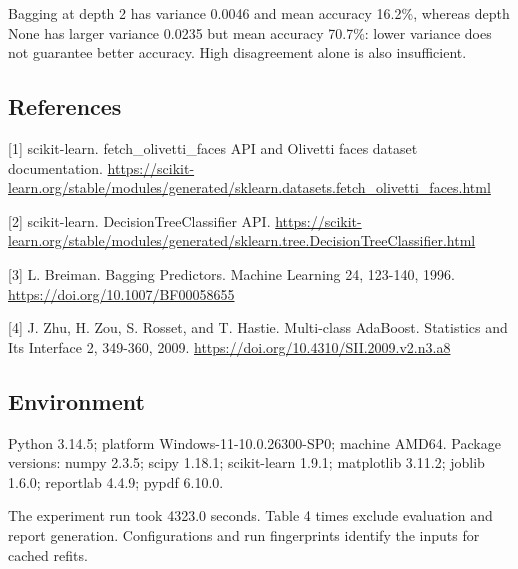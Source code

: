 \documentclass[10pt,twocolumn,letterpaper]{article}
\begin{document}
Bagging at depth 2 has variance 0.0046 and mean accuracy 16.2\%, whereas depth None has larger variance 0.0235 but mean accuracy 70.7\%: lower variance does not guarantee better accuracy. High disagreement alone is also insufficient.

\subsection*{References}
[1] scikit-learn. fetch\_olivetti\_faces API and Olivetti faces dataset documentation. \url{https://scikit-learn.org/stable/modules/generated/sklearn.datasets.fetch_olivetti_faces.html}

[2] scikit-learn. DecisionTreeClassifier API. \url{https://scikit-learn.org/stable/modules/generated/sklearn.tree.DecisionTreeClassifier.html}

[3] L. Breiman. Bagging Predictors. Machine Learning 24, 123-140, 1996. \url{https://doi.org/10.1007/BF00058655}

[4] J. Zhu, H. Zou, S. Rosset, and T. Hastie. Multi-class AdaBoost. Statistics and Its Interface 2, 349-360, 2009. \url{https://doi.org/10.4310/SII.2009.v2.n3.a8}

\subsection*{Environment}
Python 3.14.5; platform Windows-11-10.0.26300-SP0; machine AMD64. Package versions: numpy 2.3.5; scipy 1.18.1; scikit-learn 1.9.1; matplotlib 3.11.2; joblib 1.6.0; reportlab 4.4.9; pypdf 6.10.0.

The experiment run took 4323.0 seconds. Table 4 times exclude evaluation and report generation. Configurations and run fingerprints identify the inputs for cached refits.
\end{document}

